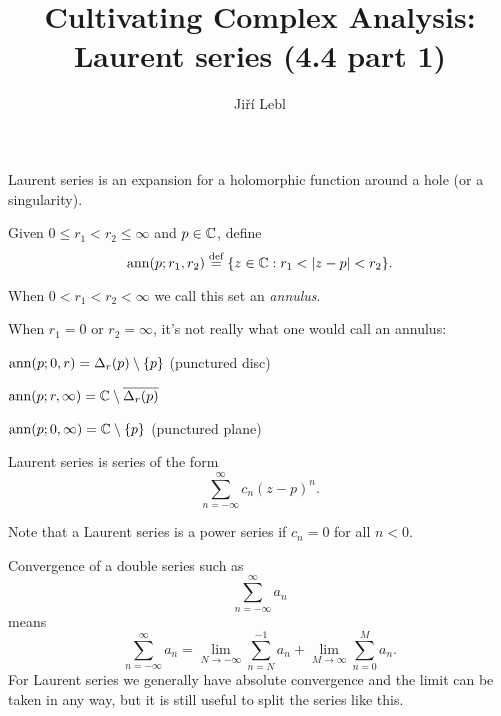 \documentclass[10pt,aspectratio=169]{beamer}
\author{Ji\v{r}\'i Lebl}
\institute[OSU]{%
Departemento pri Matematiko de Oklahoma {\^S}tata Universitato}
\title{Cultivating Complex Analysis:\\%
Laurent series (4.4 part 1)}
\date{}
\begin{document}
\begin{frame}
\titlepage
\end{frame}

\begin{frame}
Laurent series is an expansion for a holomorphic function around a
hole (or a singularity).

\pause
\medskip

Given $0 \leq r_1 < r_2 \leq \infty$ and $p \in {\mathbb{C}}$, define
\begin{equation*}
\operatorname{ann}(p;r_1,r_2)
\overset{\text{def}}{=}
\{ z \in {\mathbb{C}} : r_1 < \lvert {z - p} \rvert < r_2 \} .
\end{equation*}

\pause

When $0 < r_1 < r_2 < \infty$ we call this set an \emph{annulus}.

\medskip
\pause

When $r_1=0$ or $r_2=\infty$, it's not really what one would call an annulus:

\medskip
\pause

$\operatorname{ann}(p;0,r) = \Delta_r(p) \setminus \{ p \}$ \quad (punctured disc)

\medskip
\pause

$\operatorname{ann}(p;r,\infty) = {\mathbb{C}} \setminus \overline{\Delta_r(p)}$

\medskip
\pause

$\operatorname{ann}(p;0,\infty) = {\mathbb{C}} \setminus \{ p \}$ \quad (punctured plane)
\end{frame}

\begin{frame}
Laurent series is series of the form
\[
\sum_{n=-\infty}^{\infty} c_n {(z-p)}^n .
\]

\pause

Note that a Laurent series is a power series if $c_n=0$ for all $n < 0$.

\medskip
\pause

Convergence of a double series such as
\[
\sum_{n=-\infty}^{\infty} a_n
\]
means
\[
\sum_{n=-\infty}^{\infty} a_n
=
\lim_{N\to -\infty}
\sum_{n=N}^{-1} a_n
+
\lim_{M\to \infty}
\sum_{n=0}^{M} a_n .
\]
\pause
For Laurent series we generally have absolute convergence and
the limit can be taken in any way, but it is still useful to split
the series like this.
\end{frame}
\end{document}
